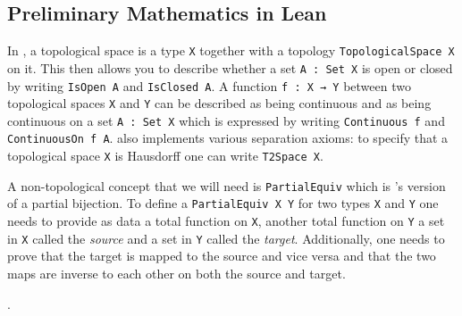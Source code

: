 \subsection{Preliminary Mathematics in Lean}\label{sub:mathinlean}

In \mathlib, a topological space is a type \lstinline|X| together with a topology \lstinline|TopologicalSpace X| on it.
This then allows you to describe whether a set \lstinline|A : Set X| is open or closed by writing \lstinline|IsOpen A| and \lstinline|IsClosed A|. 
A function \lstinline|f : X → Y| between two topological spaces \lstinline|X| and \lstinline|Y| can be described as being continuous and as being continuous on a set \lstinline|A : Set X| which is expressed by writing \lstinline|Continuous f| and \lstinline|ContinuousOn f A|. 
\mathlib also implements various separation axioms: to specify that a topological space \lstinline|X| is Hausdorff one can write \lstinline|T2Space X|.

A non-topological concept that we will need is \lstinline|PartialEquiv| which is \mathlib's version of a partial bijection. 
To define a \lstinline|PartialEquiv X Y| for two types \lstinline|X| and \lstinline|Y| one needs to provide as data a total function on \lstinline|X|, another total function on \lstinline|Y| a set in \lstinline|X| called the \emph{source} and a set in \lstinline|Y| called the \emph{target}. 
Additionally, one needs to prove that the target is mapped to the source and vice versa and that the two maps are inverse to each other on both the source and target. 

.